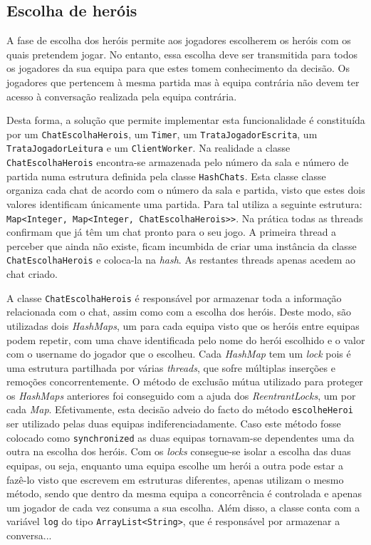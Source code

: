 \documentclass[a4paper]{article}
\begin{document}
\subsection{Escolha de heróis}

\hspace{3mm} A fase de escolha dos heróis permite aos jogadores escolherem os heróis com os quais pretendem jogar. No entanto, essa escolha deve ser transmitida para todos os jogadores da sua equipa para que estes tomem conhecimento da decisão. Os jogadores que pertencem à mesma partida mas à equipa contrária não devem ter acesso à conversação realizada pela equipa contrária.

Desta forma, a solução que permite implementar esta funcionalidade é constituída por um \texttt{ChatEscolhaHerois}, um \texttt{Timer}, um \texttt{TrataJogadorEscrita}, um \texttt{TrataJogadorLeitura} e um \texttt{ClientWorker}. Na realidade a classe \texttt{ChatEscolhaHerois} encontra-se armazenada pelo número da sala e número de partida numa estrutura definida pela classe \texttt{HashChats}. Esta classe classe organiza cada chat de acordo com o número da sala e partida, visto que estes dois valores identificam únicamente uma partida. Para tal utiliza a seguinte estrutura: \texttt{Map<Integer, Map<Integer, ChatEscolhaHerois>>}. Na prática todas as threads confirmam que já têm um chat pronto para o seu jogo. A primeira thread a perceber que ainda não existe, ficam incumbida de criar uma instância da classe \texttt{ChatEscolhaHerois} e coloca-la na \textit{hash}. As restantes threads apenas acedem ao chat criado.

A classe \texttt{ChatEscolhaHerois} é responsável por armazenar toda a informação relacionada com o chat, assim como com a escolha dos heróis. Deste modo, são utilizadas dois \textit{HashMaps}, um para cada equipa visto que os heróis entre equipas podem repetir, com uma chave identificada pelo nome do herói escolhido e o valor com o username do jogador que o escolheu. Cada \textit{HashMap} tem um \textit{lock} pois é uma estrutura partilhada por várias \textit{threads}, que sofre múltiplas inserções e remoções concorrentemente. O método de exclusão mútua utilizado para proteger os \textit{HashMaps} anteriores foi conseguido com a ajuda dos \textit{ReentrantLocks}, um por cada \textit{Map}. Efetivamente, esta decisão adveio do facto do método \texttt{escolheHeroi} ser utilizado pelas duas equipas indiferenciadamente. Caso este método fosse colocado como \texttt{synchronized} as duas equipas tornavam-se dependentes uma da outra na escolha dos heróis. Com os \textit{locks} consegue-se isolar a escolha das duas equipas, ou seja, enquanto uma equipa escolhe um herói a outra pode estar a fazê-lo visto que escrevem em estruturas diferentes, apenas utilizam o mesmo método, sendo que dentro da mesma equipa a concorrência é controlada e apenas um jogador de cada vez consuma a sua escolha. 
Além disso, a classe conta com a variável \texttt{log} do tipo \texttt{ArrayList<String>}, que é responsável por armazenar a conversa...
\end{document}
